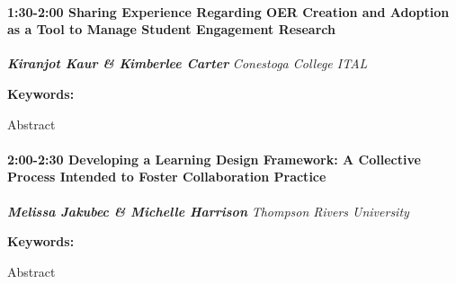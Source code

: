 \documentclass[
]{book}
\begin{document}
\begin{session}
\hypertarget{sharing-experience-regarding-oer-creation-and-adoption-as-a-tool-to-manage-student-engagement-research}{%
\paragraph*{\texorpdfstring{1:30-2:00 \textbar{} \textbf{Sharing
Experience Regarding OER Creation and Adoption as a Tool to Manage
Student Engagement} \textbar{}
Research}{1:30-2:00 \textbar{} Sharing Experience Regarding OER Creation and Adoption as a Tool to Manage Student Engagement \textbar{} Research}}\label{sharing-experience-regarding-oer-creation-and-adoption-as-a-tool-to-manage-student-engagement-research}}

\textbf{\emph{Kiranjot Kaur \& Kimberlee Carter}} \textbar{}
\emph{Conestoga College ITAL}

\textbf{Keywords:}

Abstract
\end{session}
\begin{session}
\hypertarget{developing-a-learning-design-framework-a-collective-process-intended-to-foster-collaboration-practice}{%
\paragraph*{\texorpdfstring{2:00-2:30 \textbar{} \textbf{Developing a
Learning Design Framework: A Collective Process Intended to Foster
Collaboration} \textbar{}
Practice}{2:00-2:30 \textbar{} Developing a Learning Design Framework: A Collective Process Intended to Foster Collaboration \textbar{} Practice}}\label{developing-a-learning-design-framework-a-collective-process-intended-to-foster-collaboration-practice}}

\textbf{\emph{Melissa Jakubec \& Michelle Harrison}} \textbar{}
\emph{Thompson Rivers University}

\textbf{Keywords:}

Abstract
\end{session}
\end{document}
